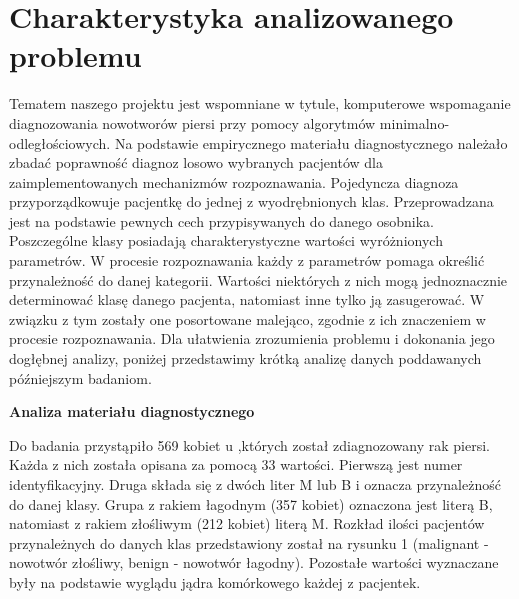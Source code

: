 \documentclass[12pt]{article}
\begin{document}
\section{Charakterystyka analizowanego problemu}
Tematem naszego projektu jest wspomniane w tytule, komputerowe wspomaganie diagnozowania nowotworów piersi przy pomocy algorytmów minimalno-odległościowych. Na podstawie empirycznego materiału diagnostycznego należało zbadać poprawność diagnoz losowo wybranych pacjentów dla zaimplementowanych mechanizmów rozpoznawania.
\newline
\indent Pojedyncza diagnoza przyporządkowuje pacjentkę do jednej z wyodrębnionych klas. Przeprowadzana jest na podstawie pewnych cech przypisywanych do danego osobnika. Poszczególne klasy posiadają charakterystyczne wartości wyróżnionych parametrów. W procesie rozpoznawania każdy z parametrów pomaga określić przynależność do danej kategorii. Wartości niektórych z nich mogą jednoznacznie determinować klasę danego pacjenta, natomiast inne tylko ją zasugerować. W związku z tym zostały one posortowane malejąco, zgodnie z ich znaczeniem w procesie rozpoznawania. 
\newline \indent Dla ułatwienia zrozumienia problemu i dokonania jego dogłębnej analizy, poniżej przedstawimy krótką analizę danych poddawanych późniejszym badaniom.
\newline \newline
\centerline{\textbf{Analiza materiału diagnostycznego}}
\newline \newline 
\indent Do badania przystąpiło 569 kobiet u ,których został zdiagnozowany rak piersi. Każda z nich została opisana za pomocą 33 wartości. Pierwszą jest numer identyfikacyjny. Druga składa się z dwóch liter M lub B i oznacza przynależność do danej klasy.  Grupa z rakiem łagodnym (357 kobiet) oznaczona jest literą B, natomiast z rakiem złośliwym (212 kobiet) literą M. Rozkład ilości pacjentów przynależnych do danych klas przedstawiony został na rysunku 1 (malignant - nowotwór złośliwy, benign - nowotwór łagodny). Pozostałe wartości wyznaczane były na podstawie wyglądu jądra komórkowego każdej z pacjentek.
\newline
\end{document}
